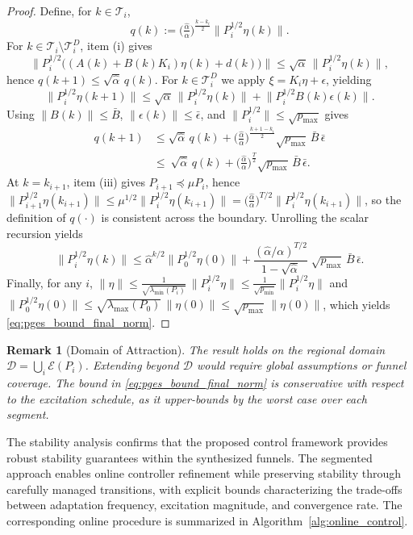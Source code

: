 \documentclass[letterpaper, 10 pt, conference]{ieeeconf}
\newtheorem{remark}{Remark}
\begin{document}
\begin{proof}
Define, for $k\in\mathcal{T}_i$,
\[
q(k):=\Big(\tfrac{\hat\alpha}{\alpha}\Big)^{\frac{k-k_i}{2}}\big\|P_i^{1/2}\eta(k)\big\|.
\]
For $k\in\mathcal{T}_i\setminus\mathcal{T}_i^D$, item (i) gives
\[
\big\|P_i^{1/2}\!\big((A(k){+}B(k)K_i)\eta(k)+d(k)\big)\big\|
\le \sqrt{\alpha}\,\big\|P_i^{1/2}\eta(k)\big\|,
\]
hence $q(k{+}1)\le \sqrt{\hat\alpha}\,q(k)$. 
For $k\in\mathcal{T}_i^D$ we apply $\xi=K_i\eta+\epsilon$, yielding
\[
\big\|P_i^{1/2}\eta(k{+}1)\big\|
\le \sqrt{\alpha}\,\big\|P_i^{1/2}\eta(k)\big\|
     + \big\|P_i^{1/2}B(k)\epsilon(k)\big\|.
\]
Using $\|B(k)\|\le\bar B$, $\|\epsilon(k)\|\le\bar\epsilon$, and $\|P_i^{1/2}\|\le \sqrt{p_{\max}}$ gives
\begin{align*}
    q(k{+}1)&\le \sqrt{\hat\alpha}\,q(k)
           + \Big(\tfrac{\hat\alpha}{\alpha}\Big)^{\!\frac{k+1-k_i}{2}}\sqrt{p_{\max}}\,\bar B\,\bar\epsilon
           \\ &\le\ 
           \sqrt{\hat\alpha}\,q(k)
           + \Big(\tfrac{\hat\alpha}{\alpha}\Big)^{\!\frac{T}{2}}\sqrt{p_{\max}}\,\bar B\,\bar\epsilon.
\end{align*}
At $k=k_{i+1}$, item (iii) gives $P_{i+1}\preceq \mu P_i$, hence
$\|P_{i+1}^{1/2}\eta(k_{i+1})\|\le \mu^{1/2}\|P_i^{1/2}\eta(k_{i+1})\|
= \big(\tfrac{\hat\alpha}{\alpha}\big)^{T/2}\|P_i^{1/2}\eta(k_{i+1})\|$, so the definition of $q(\cdot)$ is consistent across the boundary. Unrolling the scalar recursion yields
\[
\big\|P_i^{1/2}\eta(k)\big\|
\le \hat\alpha^{k/2}\big\|P_0^{1/2}\eta(0)\big\|
   + \frac{(\hat\alpha/\alpha)^{T/2}}{1-\sqrt{\hat\alpha}}\;\sqrt{p_{\max}}\,\bar B\,\bar\epsilon.
\]
Finally, for any $i$, $\|\eta\|\le \frac{1}{\sqrt{\lambda_{\min}(P_i)}}\,\|P_i^{1/2}\eta\|\le \frac{1}{\sqrt{p_{\min}}}\|P_i^{1/2}\eta\|$ and
$\|P_0^{1/2}\eta(0)\|\le \sqrt{\lambda_{\max}(P_0)}\,\|\eta(0)\|\le \sqrt{p_{\max}}\,\|\eta(0)\|$, which yields \eqref{eq:pges_bound_final_norm}.
\end{proof}

\begin{remark}[Domain of Attraction]
The result holds on the regional domain $\mathcal{D}=\bigcup_i\mathcal{E}(P_i)$. Extending beyond $\mathcal{D}$ would require global assumptions or funnel coverage. The bound in \eqref{eq:pges_bound_final_norm} is conservative with respect to the excitation schedule, as it upper-bounds by the worst case over each segment.
\end{remark}


The stability analysis confirms that the proposed control framework provides robust stability guarantees within the synthesized funnels. The segmented approach enables online controller refinement while preserving stability through carefully managed transitions, with explicit bounds characterizing the trade-offs between adaptation frequency, excitation magnitude, and convergence rate. The corresponding online procedure is summarized in Algorithm~\ref{alg:online_control}.
\end{document}

